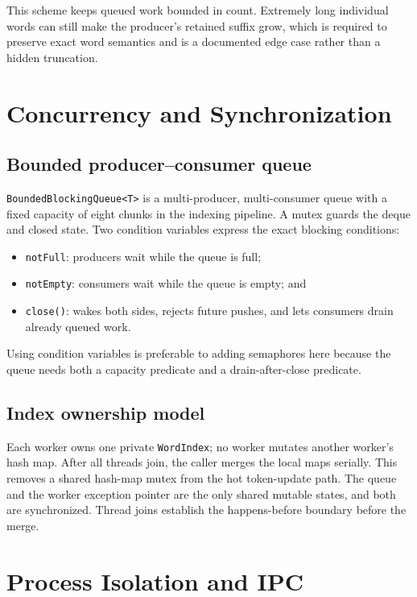 \documentclass[11pt]{article}
\begin{document}
This scheme keeps queued work bounded in count. Extremely long individual words
can still make the producer's retained suffix grow, which is required to
preserve exact word semantics and is a documented edge case rather than a
hidden truncation.

\section{Concurrency and Synchronization}

\subsection{Bounded producer--consumer queue}

\texttt{BoundedBlockingQueue<T>} is a multi-producer, multi-consumer queue
with a fixed capacity of eight chunks in the indexing pipeline. A mutex guards
the deque and closed state. Two condition variables express the exact blocking
conditions:

\begin{itemize}[noitemsep]
  \item \texttt{notFull}: producers wait while the queue is full;
  \item \texttt{notEmpty}: consumers wait while the queue is empty; and
  \item \texttt{close()}: wakes both sides, rejects future pushes, and lets
        consumers drain already queued work.
\end{itemize}

Using condition variables is preferable to adding semaphores here because the
queue needs both a capacity predicate and a drain-after-close predicate.

\subsection{Index ownership model}

Each worker owns one private \texttt{WordIndex}; no worker mutates another
worker's hash map. After all threads join, the caller merges the local maps
serially. This removes a shared hash-map mutex from the hot token-update path.
The queue and the worker exception pointer are the only shared mutable states,
and both are synchronized. Thread joins establish the happens-before boundary
before the merge.

\section{Process Isolation and IPC}
\end{document}
